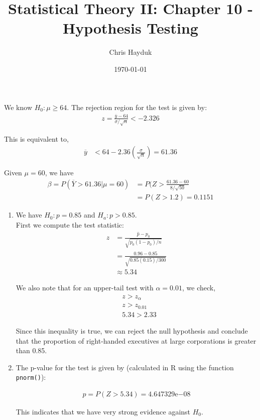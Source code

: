\documentclass[12pt]{article}
\newenvironment{problem}[2][Problem]{\begin{trivlist}
\item[\hskip \labelsep {\bfseries #1}\hskip \labelsep {\bfseries #2.}]}{\end{trivlist}}
\begin{document}
\title{Statistical Theory II: Chapter 10 - Hypothesis Testing}

\author{Chris Hayduk}
\date{\today}

\maketitle

\begin{problem}{10.38}
\end{problem}

We know $H_0: \mu \geq 64$. The rejection region for the test is given by:
\begin{align*}
	z = \frac{\overline{y} - 64}{\sigma/\sqrt{n}} < -2.326
\end{align*}

This is equivalent to,
\begin{align*}
	\overline{y} &< 64 - 2.36\left(\frac{\sigma}{\sqrt{n}}\right) = 61.36
\end{align*}

Given $\mu = 60$, we have
\begin{align*}
	\beta = P(\overline{Y} > 61.36 | \mu = 60) &= P(Z > \frac{61.36-60}{8/\sqrt{50}}\\
	&= P(Z > 1.2) = 0.1151
\end{align*}

\begin{problem}{10.54}
\end{problem}

\begin{enumerate}[label=\alph*)]
	\item We have $H_0: p = 0.85$ and $H_a: p > 0.85$.\\
	
	First we compute the test statistic:
	 \begin{align*}
		z &= \frac{\hat{p} - p_0}{\sqrt{p_0(1-p_0)/n}}\\
		&= \frac{0.96 - 0.85}{\sqrt{0.85(0.15)/300}}\\
		&\approx 5.34
	\end{align*}
	
	We also note that for an upper-tail test with $\alpha = 0.01$, we check,
	\begin{align*}
		&z > z_{\alpha}\\
		&z > z_{0.01}\\
		&5.34 > 2.33
	\end{align*}
	
	Since this inequality is true, we can reject the null hypothesis and conclude that the proportion of right-handed executives at large corporations is greater than 0.85.
	
	\item The p-value for the test is given by (calculated in R using the function \texttt{pnorm()}):
	
	\begin{align*}
		p = P(Z > 5.34) = 4.647329\mathrm{e}{-08}
	\end{align*}
	
	This indicates that we have very strong evidence against $H_0$.
\end{enumerate}
\end{document}
